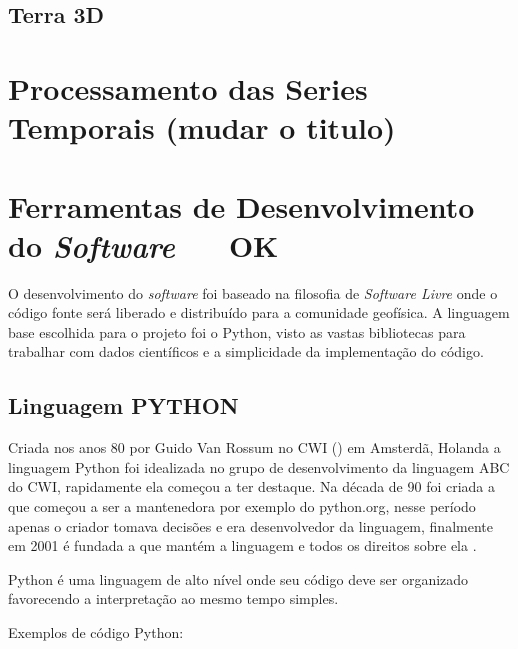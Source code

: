         
        \subsection{Terra 3D}
    
    \section{Processamento das Series Temporais (mudar o titulo)}
    
    
    
    
    
    \section{Ferramentas de Desenvolvimento do \textit{Software} \,\,\,\,\,\,\, OK}
    
        O desenvolvimento do \textit{software} foi baseado na filosofia de \textit{Software Livre} \cite{soft_free} onde o código fonte será liberado e distribuído para a comunidade geofísica. A linguagem base escolhida para o projeto foi o Python, visto as vastas bibliotecas para trabalhar com dados científicos e a simplicidade da implementação do código.  
        
        \subsection{Linguagem PYTHON}
            \label{lim_python}
            
            Criada nos anos 80 por Guido Van Rossum no CWI () em Amsterdã, Holanda a linguagem Python foi idealizada no grupo de desenvolvimento da linguagem ABC do CWI, rapidamente ela começou a ter destaque. Na década de 90 foi criada a  que começou a ser a mantenedora por exemplo do python.org, nesse período apenas o criador tomava decisões e era desenvolvedor da linguagem, finalmente em 2001 é fundada a  que mantém a linguagem e todos os direitos sobre ela \cite{python36}.  
            
            Python é uma linguagem de alto nível onde seu código deve ser organizado favorecendo a interpretação ao mesmo tempo simples.
            
            Exemplos de código Python:

